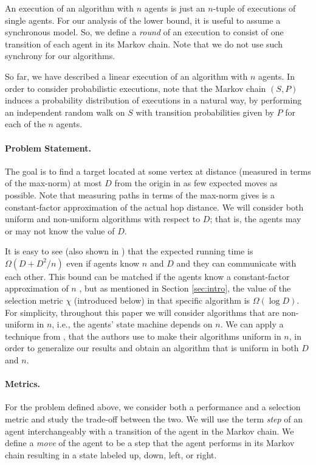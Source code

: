 \documentclass[11pt]{article}
\begin{document}
An execution of an algorithm with $n$ agents is just an $n$-tuple of executions of single agents. For our analysis of the lower bound, it is useful to assume a synchronous model. So, we define a \emph{round} of an execution to consist of one transition of each agent in its Markov chain. Note that we do not use such synchrony for our algorithms.

So far, we have described a linear execution of an algorithm with $n$ agents. In order to consider probabilistic executions, note that the Markov chain $(S,P)$ induces a probability distribution of executions in a natural way, by performing an independent random walk on $S$ with transition probabilities given by $P$ for each of the $n$ agents.

\paragraph{Problem Statement.}
The goal is to find a target located at some vertex at distance (measured in terms of the max-norm) at most $D$ from the origin in as few expected moves as possible. Note that measuring paths in terms of the max-norm gives is a constant-factor approximation of the actual hop distance. We will consider both uniform and non-uniform algorithms with respect to $D$; that is, the agents may or may not know the value of $D$. 

It is easy to see (also shown in \cite{feinerman12podc}) that the expected running time is $\Omega(D + D^2/n)$ even if agents know $n$ and $D$ and they can communicate with each other. This bound can be matched if the agents know a constant-factor approximation of $n$ \cite{feinerman12podc}, but as mentioned in Section \ref{sec:intro}, the value of the selection metric $\chi$ (introduced below) in that specific algorithm is $\Omega(\log D)$. For simplicity, throughout this paper we will consider algorithms that are non-uniform in $n$, i.e., the agents' state machine depends on $n$. We can apply a technique from \cite{feinerman12podc}, that the authors use to make their algorithms uniform in $n$, in order to generalize our results and obtain an algorithm that is uniform in both $D$ and $n$.


\paragraph{Metrics. } For the problem defined above, we consider both a performance and a selection metric and study the trade-off between the two. 
We will use the term \emph{step} of an agent interchangeably with a transition of the agent in the Markov chain. We define a \emph{move} of the agent to be a step that the agent performs in its Markov chain resulting in a state labeled up, down, left, or right. 
\end{document}
